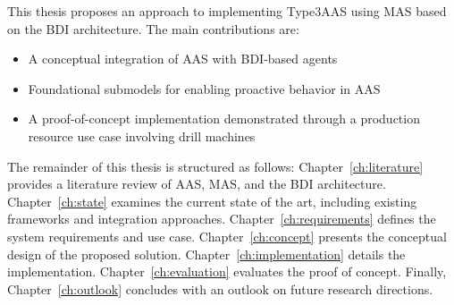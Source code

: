 
This thesis proposes an approach to implementing \ac{Type3AAS} using \ac{MAS} based on the \ac{BDI} architecture.
The main contributions are:
\begin{itemize}
    \item A conceptual integration of \ac{AAS} with \ac{BDI}-based agents
    \item Foundational submodels for enabling proactive behavior in \ac{AAS}
    \item A proof-of-concept implementation demonstrated through a production resource use case involving drill machines
\end{itemize}
The remainder of this thesis is structured as follows:
Chapter~\ref{ch:literature} provides a literature review of \ac{AAS}, \ac{MAS}, and the \ac{BDI} architecture.
Chapter~\ref{ch:state} examines the current state of the art, including existing frameworks and integration approaches.
Chapter~\ref{ch:requirements} defines the system requirements and use case.
Chapter~\ref{ch:concept} presents the conceptual design of the proposed solution.
Chapter~\ref{ch:implementation} details the implementation.
Chapter~\ref{ch:evaluation} evaluates the proof of concept.
Finally, Chapter~\ref{ch:outlook} concludes with an outlook on future research directions.
